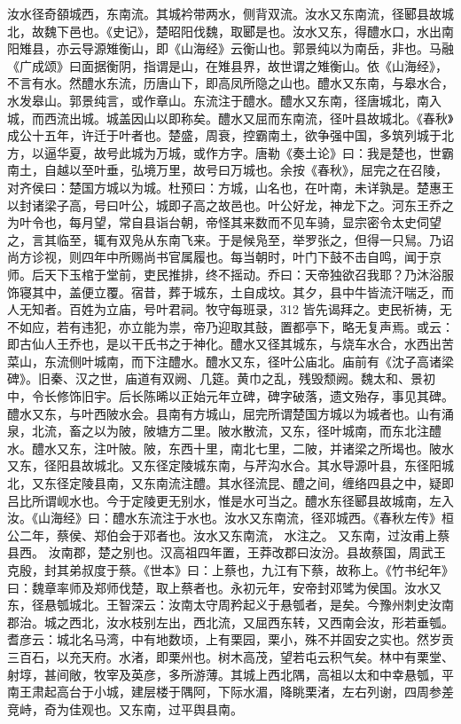 \documentclass[12pt,UTF8]{ctexbook}
\begin{document}
汝水径奇頟城西，东南流。其城衿带两水，侧背双流。汝水又东南流，径郾县故城北，故魏下邑也。《史记》，楚昭阳伐魏，取郾是也。汝水又东，得醴水口，水出南阳雉县，亦云导源雉衡山，即《山海经》云衡山也。郭景纯以为南岳，非也。马融《广成颂》曰面据衡阴，指谓是山，在雉县界，故世谓之雉衡山。依《山海经》，不言有水。然醴水东流，历唐山下，即高凤所隐之山也。醴水又东南，与皋水合，水发皋山。郭景纯言，或作章山。东流注于醴水。醴水又东南，径唐城北，南入城，而西流出城。城盖因山以即称矣。醴水又屈而东南流，径叶县故城北。《春秋》成公十五年，许迁于叶者也。楚盛，周衰，控霸南土，欲争强中国，多筑列城于北方，以逼华夏，故号此城为万城，或作方字。唐勒《奏土论》曰：我是楚也，世霸南土，自越以至叶垂，弘境万里，故号曰万城也。余按《春秋》，屈完之在召陵，对齐侯曰：楚国方城以为城。杜预曰：方城，山名也，在叶南，未详孰是。楚惠王以封诸梁子高，号曰叶公，城即子高之故邑也。叶公好龙，神龙下之。河东王乔之为叶令也，每月望，常自县诣台朝，帝怪其来数而不见车骑，显宗密令太史伺望之，言其临至，辄有双凫从东南飞来。于是候凫至，举罗张之，但得一只舃。乃诏尚方诊视，则四年中所赐尚书官属履也。每当朝时，叶门下鼓不击自鸣，闻于京师。后天下玉棺于堂前，吏民推排，终不摇动。乔曰：天帝独欲召我耶？乃沐浴服饰寝其中，盖便立覆。宿昔，葬于城东，土自成坟。其夕，县中牛皆流汗喘乏，而人无知者。百姓为立庙，号叶君祠。牧守每班录，312 皆先谒拜之。吏民祈祷，无不如应，若有违犯，亦立能为祟，帝乃迎取其鼓，置都亭下，略无复声焉。或云：即古仙人王乔也，是以干氏书之于神化。醴水又径其城东，与烧车水合，水西出苦菜山，东流侧叶城南，而下注醴水。醴水又东，径叶公庙北。庙前有《沈子高诸梁碑》。旧秦、汉之世，庙道有双阙、几筵。黄巾之乱，残毁颓阙。魏太和、景初中，令长修饰旧宇。后长陈晞以正始元年立碑，碑字破落，遗文殆存，事见其碑。醴水又东，与叶西陂水会。县南有方城山，屈完所谓楚国方城以为城者也。山有涌泉，北流，畜之以为陂，陂塘方二里。陂水散流，又东，径叶城南，而东北注醴水。醴水又东，注叶陂。陂，东西十里，南北七里，二陂，并诸梁之所堨也。陂水又东，径阳县故城北。又东径定陵城东南，与芹沟水合。其水导源叶县，东径阳城北，又东径定陵县南，又东南流注醴。其水径流昆、醴之间，缠络四县之中，疑即吕比所谓岘水也。今于定陵更无别水，惟是水可当之。醴水东径郾县故城南，左入汝。《山海经》曰：醴水东流注于水也。汝水又东南流，径邓城西。《春秋左传》桓公二年，蔡侯、郑伯会于邓者也。汝水又东南流， 水注之。
又东南，过汝甫上蔡县西。
汝南郡，楚之别也。汉高祖四年置，王莽改郡曰汝汾。县故蔡国，周武王克殷，封其弟叔度于蔡。《世本》曰：上蔡也，九江有下蔡，故称上。《竹书纪年》曰：魏章率师及郑师伐楚，取上蔡者也。永初元年，安帝封邓骘为侯国。汝水又东，径悬瓠城北。王智深云：汝南太守周矜起义于悬瓠者，是矣。今豫州刺史汝南郡治。城之西北，汝水枝别左出，西北流，又屈西东转，又西南会汝，形若垂瓠。耆彦云：城北名马湾，中有地数顷，上有栗园，栗小，殊不并固安之实也。然岁贡三百石，以充天府。水渚，即栗州也。树木高茂，望若屯云积气矣。林中有栗堂、射埻，甚间敞，牧宰及英彦，多所游薄。其城上西北隅，高祖以太和中幸悬瓠，平南王肃起高台于小城，建层楼于隅阿，下际水湄，降眺栗渚，左右列谢，四周参差竞峙，奇为佳观也。又东南，过平舆县南。
\end{document}
